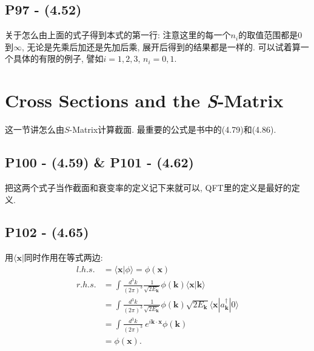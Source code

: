 \subsection{P97 - (4.52)}

关于怎么由上面的式子得到本式的第一行: 注意这里的每一个$n_i$的取值范围都是0到$\infty$, 无论是先乘后加还是先加后乘, 展开后得到的结果都是一样的.
可以试着算一个具体的有限的例子, 譬如$i = 1, 2, 3$, $n_i = 0, 1$.

\section{Cross Sections and the \textit{S}-Matrix}

这一节讲怎么由$S$-Matrix计算截面.
最重要的公式是书中的(4.79)和(4.86).

\subsection{P100 - (4.59) \& P101 - (4.62)}

把这两个式子当作截面和衰变率的定义记下来就可以, QFT里的定义是最好的定义.

\subsection{P102 - (4.65)}

用$\langle \mathbf{x}|$同时作用在等式两边:
\begin{equation}
  \begin{aligned}
    l.h.s. & = \langle \mathbf{x}|\phi \rangle = \phi(\mathbf{x})                                                                                                    \\
    r.h.s. & = \int\frac{d^3 k}{(2\pi)^3}\frac{1}{\sqrt{2E_{\mathbf{k}}}}\phi(\mathbf{k})\langle \mathbf{x}|\mathbf{k} \rangle                                       \\
           & = \int\frac{d^3 k}{(2\pi)^3}\frac{1}{\sqrt{2E_{\mathbf{k}}}}\phi(\mathbf{k})\sqrt{2E_{\mathbf{k}}}\langle \mathbf{x}|a^{\dagger}_{\mathbf{k}}|0 \rangle \\
           & = \int\frac{d^3 k}{(2\pi)^3}\ e^{i\mathbf{k}\cdot\mathbf{x}}\phi(\mathbf{k})                                                                            \\
           & = \phi(\mathbf{x}).
  \end{aligned}
\end{equation}

